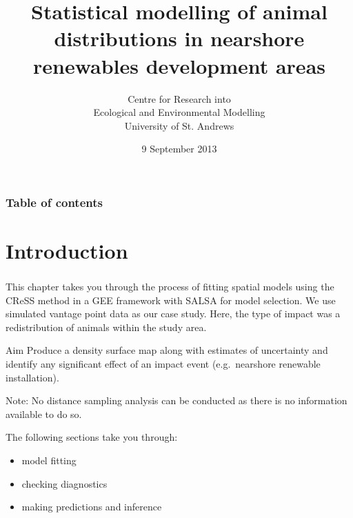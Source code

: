 \documentclass[11pt, a4paper]{article}
\begin{document}


\title{Statistical modelling of animal distributions in nearshore renewables development areas}  
\author{Centre for Research into \\
 Ecological and Environmental Modelling \\
 University of St. Andrews}
\date{9 September 2013} 
\begin{frame}
\titlepage
\end{frame}

\begin{frame}\frametitle{Table of contents}
\tableofcontents
\end{frame} 






\newpage
\section{Introduction} 
\begin{frame}
\frametitle{} 
This chapter  takes you through the process of fitting spatial models using the CReSS method in a GEE framework with SALSA for model selection.  We use simulated vantage point data as our case study. Here, the type of impact was a redistribution of animals within the study area. 

\begin{block}{Aim}
Produce a density surface map along with estimates of uncertainty and identify any significant effect of an impact event (e.g.\ nearshore renewable installation).
\end{block}

\noindent Note: No distance sampling analysis can be conducted as there is no information available to do so.

\noindent The following sections take you through:

\begin{itemize}
  \item model fitting 
  \item checking diagnostics
  \item making predictions and inference
\end{itemize}

\end{frame}


\end{document}
